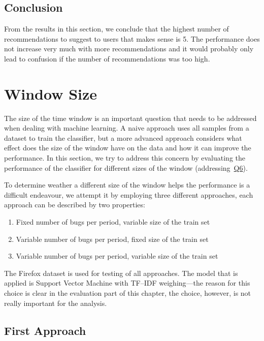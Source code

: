 \subsection{Conclusion}

From the results in this section, we conclude that the highest number of recommendations to suggest to users that makes sense is 5. The performance does not increase very much with more recommendations and it would probably only lead to confusion if the number of recommendations was too high.

\section{Window Size}
\label{section:window-size}

The size of the time window is an important question that needs to be addressed when dealing with machine learning. A naive approach uses all samples from a dataset to train the classifier, but a more advanced approach considers what effect does the size of the window have on the data and how it can improve the performance. In this section, we try to address this concern by evaluating the performance of the classifier for different sizes of the window (addressing~\hyperlink{question:6}{Q6}).

To determine weather a different size of the window helps the performance is a difficult endeavour, we attempt it by employing three different approaches, each approach can be described by two properties:

\begin{enumerate}
 \item Fixed number of bugs per period, variable size of the train set
 \item Variable number of bugs per period, fixed size of the train set
 \item Variable number of bugs per period, variable size of the train set
\end{enumerate}

The Firefox dataset is used for testing of all approaches. The model that is applied is Support Vector Machine with TF--IDF weighing---the reason for this choice is clear in the evaluation part of this chapter, the choice, however, is not really important for the analysis.

\subsection{First Approach}

